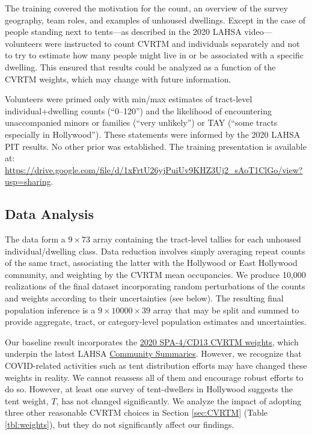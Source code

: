\documentclass[11pt,twocolumn]{article}
\def\Count{count}
\begin{document}
The training covered the motivation for the \Count, an overview of the survey geography, team roles, 
and examples of unhoused dwellings. Except in the case of people standing next to tents---as described 
in the 2020 LAHSA video---volunteers were instructed to count CVRTM and individuals separately 
and not to try to estimate how many people might live in or be associated with a specific dwelling. 
This ensured that results could be analyzed as a function of the CVRTM weights, which may change 
with future information.%

Volunteers were primed only with min/max estimates of tract-level individual+dwelling counts 
(``0--120'') and the likelihood of encountering unaccompanied minors or families (``very unlikely'')
or TAY (``some tracts especially in Hollywood''). These statements were informed by the 2020 LAHSA PIT 
results. No other prior was established. The training presentation is available 
at: \url{https://drive.google.com/file/d/1xFrtU26yjPuiUv9KHZ3Uj2_sAoT1ClGo/view?usp=sharing}.

\subsection{Data Analysis}
\label{sec:analysis}

The data form a $9\times73$ array containing the tract-level tallies for each unhoused 
individual/dwelling class. Data reduction involves simply averaging repeat counts of the same tract,
associating the latter with the Hollywood or East Hollywood community, and 
weighting by the CVRTM mean occupancies. We produce 10,000 realizations of the final dataset
incorporating random perturbations of the counts and weights according to their uncertainties 
(see below). The resulting final population inference is a $9\times10000\times39$ array that 
may be split and summed to provide aggregate, tract, or category-level population estimates and 
uncertainties.

Our baseline result incorporates the \href{https://www.lahsa.org/documents?id=4686-2020-greater-los-angeles-city-community-homelessness-report-service-planning-area-4.pdf}{2020 SPA-4/CD13 CVRTM weights}, 
which underpin the latest LAHSA \href{https://www.lahsa.org/documents?id=4686-2020-greater-los-angeles-city-community-homelessness-report-service-planning-area-4.pdf}
{Community Summaries}. However, we recognize that COVID-related activities such as tent 
distribution efforts may have changed these weights in reality. We cannot reassess all of them and 
encourage robust efforts to do so. However, at least one survey of tent-dwellers in Hollywood suggests 
the tent weight, $T$, has not changed significantly. We analyze the impact of adopting three other
reasonable CVRTM choices in Section \ref{sec:CVRTM} (Table \ref{tbl:weights}), but they do not 
significantly affect our findings.
\end{document}
